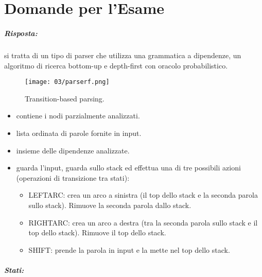 \chapter{Domande per l'Esame}


\paragraph{Risposta:} si tratta di un tipo di parser che utilizza una grammatica a dipendenze, un algoritmo di ricerca bottom-up e depth-first con oracolo probabilistico.  

\begin{figure}[!h]
    \centering
    \texttt{[image: 03/parserf.png]}
    \caption{Transition-based parsing.}
\end{figure}

\begin{itemize}
  \item {} contiene i nodi parzialmente analizzati.
  \item {} lista ordinata di parole fornite in input.
  \item {} insieme delle dipendenze analizzate. 
  \item {} guarda l'input, guarda sullo stack ed effettua una di tre possibili azioni (operazioni di transizione tra stati):
    \begin{itemize}
      \item LEFTARC: crea un arco a sinistra (il top dello stack e la seconda parola sullo stack). Rimuove la seconda parola dallo stack. 
      \item RIGHTARC: crea un arco a destra (tra la seconda parola sullo stack e il top dello stack). Rimuove il top dello stack.
      \item SHIFT: prende la parola in input e la mette nel top dello stack.
    \end{itemize}
\end{itemize}



\paragraph{Stati:}

